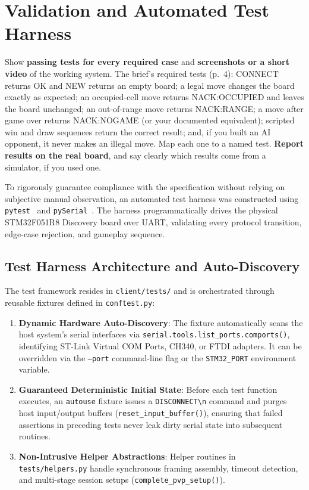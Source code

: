 \section{Validation and Automated Test Harness}
\label{sec:valid}

\begin{guidance}
Show \textbf{passing tests for every required case} and \textbf{screenshots or a
short video} of the working system. The brief's required tests (p.~4):
CONNECT returns OK and NEW returns an empty board; a legal move changes the
board exactly as expected; an occupied-cell move returns NACK:OCCUPIED and
leaves the board unchanged; an out-of-range move returns NACK:RANGE; a move
after game over returns NACK:NOGAME (or your documented equivalent); scripted
win and draw sequences return the correct result; and, if you built an AI
opponent, it never makes an illegal move. Map each one to a named test.
\textbf{Report results on the real board}, and say clearly which results come
from a simulator, if you used one.
\end{guidance}

To rigorously guarantee compliance with the specification without relying on subjective manual observation, an automated test harness was constructed using \texttt{pytest}~\cite{pytest} and \texttt{pySerial}~\cite{pyserial}. The harness programmatically drives the physical STM32F051R8 Discovery board over UART, validating every protocol transition, edge-case rejection, and gameplay sequence.

\subsection{Test Harness Architecture and Auto-Discovery}
The test framework resides in \texttt{client/tests/} and is orchestrated through reusable fixtures defined in \texttt{conftest.py}:
\begin{enumerate}
    \item \textbf{Dynamic Hardware Auto-Discovery}: The fixture automatically scans the host system's serial interfaces via \texttt{serial.tools.list\_ports.comports()}, identifying ST-Link Virtual COM Ports, CH340, or FTDI adapters. It can be overridden via the \texttt{--port} command-line flag or the \texttt{STM32\_PORT} environment variable.
    \item \textbf{Guaranteed Deterministic Initial State}: Before each test function executes, an \texttt{autouse} fixture issues a \texttt{DISCONNECT\textbackslash n} command and purges host input/output buffers (\texttt{reset\_input\_buffer()}), ensuring that failed assertions in preceding tests never leak dirty serial state into subsequent routines.
    \item \textbf{Non-Intrusive Helper Abstractions}: Helper routines in \texttt{tests/helpers.py} handle synchronous framing assembly, timeout detection, and multi-stage session setups (\texttt{complete\_pvp\_setup()}).
\end{enumerate}

